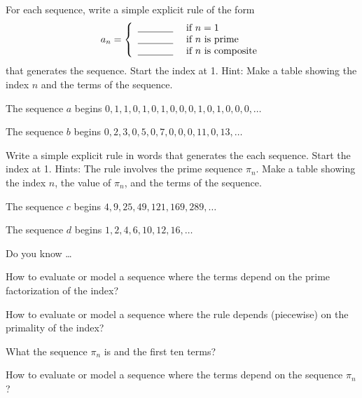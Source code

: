 \begin{exer}[\exerU] %
\label{exer_NTE_piecewise_prime}
   For each sequence, write a simple explicit rule of the form  
       $$a_n = \left\{ \begin{array} {ll}

        \underline{\hspace{.5in}} & \text{ if } n=1 \\ 
        \underline{\hspace{.5in}} & \text{ if } n \text{ is prime} \\  
        \underline{\hspace{.5in}} & \text{ if } n \text{ is composite} \\ 
        \end{array} \right.$$
    that generates the sequence. Start the index at 1. Hint: Make a table showing the index $n$ and the terms of the sequence. 
        \begin{exerpart}
            \item The sequence $a$ begins $0, 1, 1, 0, 1, 0, 1, 0, 0, 0, 1, 0, 1, 0, 0, 0,\ldots$
            \item The sequence $b$ begins $0, 2, 3, 0, 5, 0, 7, 0, 0, 0, 11, 0, 13,\ldots$
        \end{exerpart}
\end{exer}

\begin{exer}[\exerU] %
\label{exer_NTE_pisubn}
    Write a simple explicit rule in words that generates the each sequence. Start the index at 1. Hints: The rule involves the prime sequence $\pi_n$.  Make a table showing the index $n$, the value of $\pi_n$, and the terms of the sequence. 
        \begin{exerpart}
            \item The sequence $c$ begins $4, 9, 25, 49, 121, 169, 289,\ldots$ %
            \item The sequence $d$ begins $1, 2, 4, 6, 10, 12, 16,\ldots$ %
        \end{exerpart}
\end{exer}

\begin{exer}[\exerR] %
\label{exer_dyk_seq_primes}
    Do you know \ldots
        \begin{exerpart}
            \item How to evaluate or model a sequence where the terms depend on the prime factorization of the index?
            \item How to evaluate or model a sequence where the rule depends (piecewise) on the primality of the index?
            \item What the sequence $\pi_n$ is and the first ten terms?
            \item How to evaluate or model a sequence where the terms depend on the sequence $\pi_n$?
        \end{exerpart}
\end{exer}

